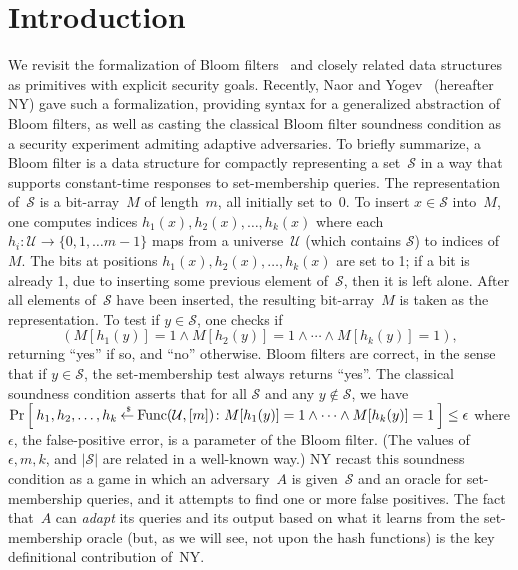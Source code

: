 
\section{Introduction}
We revisit the formalization of Bloom filters~\cite{bloom1970space} and closely
related data structures as primitives with explicit security goals.
Recently, Naor and Yogev~\cite{naor2015bloom} (hereafter NY) gave such a
formalization, providing syntax for a generalized abstraction of
Bloom filters, as well as casting the classical Bloom filter
soundness condition as a security experiment admiting adaptive
adversaries.  To briefly summarize, a Bloom filter is a data
structure for compactly representing a set~$\mathcal{S}$ in a way
that supports constant-time responses to set-membership queries. The
representation of~$\mathcal{S}$ is a bit-array~$M$ of length~$m$,
all initially set to~0.  To insert $x \in \mathcal{S}$ into~$M$, one
computes indices $h_1(x),h_2(x),\ldots,h_k(x)$ where each $h_i
\colon \mathcal{U} \to \{0,1,\ldots m-1\}$ maps from a
universe~$\mathcal{U}$ (which contains $\mathcal{S}$) to indices
of~$M$.  The bits at positions $h_1(x),h_2(x),\ldots,h_k(x)$ are set
to 1; if a bit is already 1, due to inserting some previous element
of~$\mathcal{S}$, then it is left alone.  After all elements
of~$\mathcal{S}$ have been inserted, the resulting bit-array~$M$ is
taken as the representation.  To test if $y \in \mathcal{S}$, one
checks if \[(M[h_1(y)]=1 \wedge M[h_2(y)]=1 \wedge \cdots \wedge
M[h_k(y)]=1),\] returning ``yes'' if so, and ``no'' otherwise. Bloom
filters are correct, in the sense that if $y \in \mathcal{S}$, the
set-membership test always returns ``yes''.  The classical soundness
condition asserts that for all $\mathcal{S}$ and any $y
\notin\mathcal{S}$, we have $\Pr\left[\: h_1,h_2,\ldots,h_k {\:\stackrel{{\scriptscriptstyle \hspace{0.2em}\$}} {\leftarrow}\:}
\mathrm{Func}(\mathcal{U},[m])\colon M[h_1(y)]=1 \wedge \cdots
\wedge M[h_k(y)]=1 \:\right] \leq \epsilon$ where $\epsilon$, the
false-positive error, is a parameter of the Bloom filter.  (The
values of~$\epsilon,m,k$, and $|\mathcal{S}|$ are related in a
well-known way.) NY recast this soundness condition as a game in
which an adversary~$A$ is given~$\mathcal{S}$ and an oracle for
set-membership queries, and it attempts to find one or more false
positives. The fact that~$A$ can \emph{adapt} its queries and its
output based on what it learns from the set-membership oracle (but,
as we will see, not upon the hash functions) is the key definitional
contribution of~NY.

